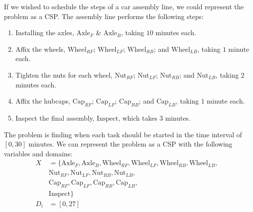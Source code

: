 \begin{example}
    If we wished to schedule the steps of a car assembly line, we could represent the problem as a CSP. The assembly line performs the following steps:\\
    \begin{enumerate}
        \item Installing the axles, $\text{Axle}_{F}$ \& $\text{Axle}_{B}$, taking $10$ minutes each.
        \item Affix the wheels, $\text{Wheel}_{RF}$; $\text{Wheel}_{LF}$; $\text{Wheel}_{RB}$; and $\text{Wheel}_{LB}$, taking $1$ minute each.
        \item Tighten the nuts for each wheel, $\text{Nut}_{RF}$; $\text{Nut}_{LF}$; $\text{Nut}_{RB}$; and $\text{Nut}_{LB}$, taking $2$ minutes each.
        \item Affix the hubcaps, $\text{Cap}_{RF}$; $\text{Cap}_{LF}$; $\text{Cap}_{RB}$; and $\text{Cap}_{LB}$, taking $1$ minute each.
        \item Inspect the final assembly, $\text{Inspect}$, which takes $3$ minutes.
    \end{enumerate}
    The problem is finding when each task should be started in the time interval of $[0, 30] \text{ minutes}$. We can represent the problem as a CSP with the following variables and domains:\\
    \begin{align*}
        X &= \{ \text{Axle}_{F}, \text{Axle}_{B}, \text{Wheel}_{RF}, \text{Wheel}_{LF}, \text{Wheel}_{RB}, \text{Wheel}_{LB}, \\
        &\text{Nut}_{RF}, \text{Nut}_{LF}, \text{Nut}_{RB}, \text{Nut}_{LB}, \\
        &\text{Cap}_{RF}, \text{Cap}_{LF}, \text{Cap}_{RB}, \text{Cap}_{LB}, \\
        &\text{Inspect} \}\\
        D_{i} &= [0, 27]
    \end{align*}


\end{example}
